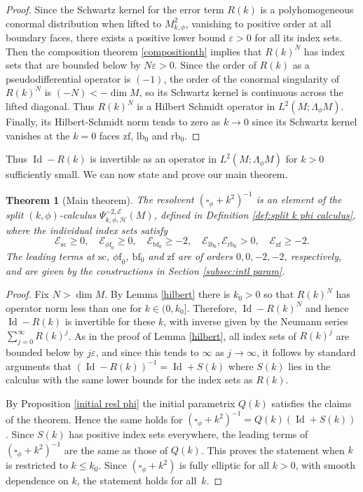 \documentclass[11pt]{article}
\numberwithin{equation}{section}
\theoremstyle{plain}
\newtheorem{Th}{Theorem}[section]
\theoremstyle{definition}
\newcommand\calE{{\mathcal E}}
\newcommand{\calH}{{\mathscr{H}}}
\newcommand{\phif}{{\phi\mathrm{f}}}
\newcommand{\lf}{{\mathrm{lb}}}
\newcommand{\rf}{{\mathrm{rb}}}
\newcommand{\bbf}{{\mathrm{bf}}}
\newcommand{\bbfz}{{\bbf_0}}
\newcommand{\ssc}{{\mathrm{sc}}}
\newcommand{\zf}{{\mathrm{zf}}}
\DeclareMathOperator{\Id}{Id}
\let\eps\varepsilon
\begin{document}
\begin{proof}
Since the Schwartz kernel for the error term $R(k)$ is a polyhomogeneous
conormal distribution when lifted to $M^2_{k,\phi}$, vanishing to positive order at all boundary faces,
there exists a positive lower bound $\varepsilon > 0$ for all its index sets.
Then the composition theorem \ref{compositionth} implies that $R(k)^N$ has index sets that are bounded below by
$N\varepsilon>0$. Since the order of $R(k)$ as a pseudodifferential operator is $(-1)$, the order of the conormal singularity of $R(k)^N$ is $(-N)<-\dim M$, so its Schwartz kernel is continuous across the lifted diagonal.
Thus $R(k)^N$ is a Hilbert Schmidt operator in $L^2(M;\Lambda_\phi M)$.
Finally, its Hilbert-Schmidt norm tends to zero as $k\to0$ since its Schwartz kernel vanishes at the $k=0$ faces $\zf$, $\lf_0$ and $\rf_0$.
\end{proof}

Thus $\Id - R(k)$ is invertible as an operator in $L^2(M;\Lambda_\phi M)$ for $k>0$ sufficiently small.
We can now state and prove our main theorem.

\begin{Th}[Main theorem] \label{thm:main thm detail}
The resolvent $(\square_{\phi} + k^{2})^{-1}$ is an element of the split $(k,\phi)$-calculus
$\Psi_{k, \phi,\calH}^{-2,\calE}(M)$, defined in Definition \ref{def:split k phi calculus}, where the individual index sets satisfy\vspace*{-3pt}
\begin{equation}\label{lower-bounds-index-sets}
\mathcal{E}_{\ssc} \geq 0,\quad
\mathcal{E}_{\phif_0} \geq 0, \quad
\mathcal{E}_{\bbf_0} \geq -2, \quad \mathcal{E}_{\lf_0}, \mathcal{E}_{\rf_0} >0,
\quad \mathcal{E}_{\zf} \geq -2.
\end{equation}
The leading terms at $\ssc$, $\phif_0$, $\bbfz$ and $\zf$ are of orders $0,0,-2,-2$, respectively, and are given by the constructions in Section \ref{subsec:intl param}.
\end{Th}

\begin{proof}
Fix $N>\dim M$.
By Lemma \ref{hilbert} there is $k_0>0$ so that $R(k)^N$ has operator norm less than one for $k\in(0,k_0]$.
Therefore, $\Id - R(k)^N$ and hence
$\Id - R(k)$ is invertible for these $k$, with inverse given by the Neumann series $\sum_{j=0}^\infty R(k)^j$.
As in the proof of Lemma \ref{hilbert}, all index sets of $R(k)^{j}$ are bounded below by $j\eps$, and since this tends to $\infty$ as $j\to\infty$, it follows by standard arguments that $(\Id - R(k))^{-1}=\Id+S(k)$ where $S(k)$ lies in the calculus with the same lower bounds for the index sets as $R(k)$.

By Proposition \ref{initial resl phi} the initial parametrix $Q(k)$ satisfies the claims of the theorem. Hence the same holds for $(\square_\phi+k^2)^{-1} = Q(k)(\Id+S(k))$.
Since $S(k)$ has positive index sets everywhere, the leading terms of $(\square_\phi+k^2)^{-1}$ are the same as those of $Q(k)$.
This proves the statement when $k$ is restricted to $k\leq k_0$. Since
$(\square_{\phi} + k^{2})$ is fully elliptic for all $k>0$, with smooth dependence on $k$, the statement holds for all~$k$.
\end{proof}
\end{document}
